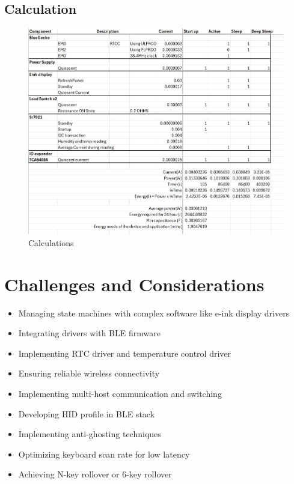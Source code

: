 \documentclass[a4paper,11pt]{article}%
\begin{document}
\subsection{Calculation}
\begin{figure}[H]
    \centering
    \includegraphics[scale=0.63]{figures/calc.jpeg}
    \caption{Calculations}
\end{figure}
\vspace{0.2cm}



\section{Challenges and Considerations}
\begin{itemize}
\item Managing state machines with complex software like e-ink display drivers
\item Integrating drivers with BLE firmware
\item Implementing RTC driver and temperature control driver
\item Ensuring reliable wireless connectivity
\item Implementing multi-host communication and switching
\item Developing HID profile in BLE stack
\item Implementing anti-ghosting techniques
\item Optimizing keyboard scan rate for low latency
\item Achieving N-key rollover or 6-key rollover
\end{itemize}
\end{document}
